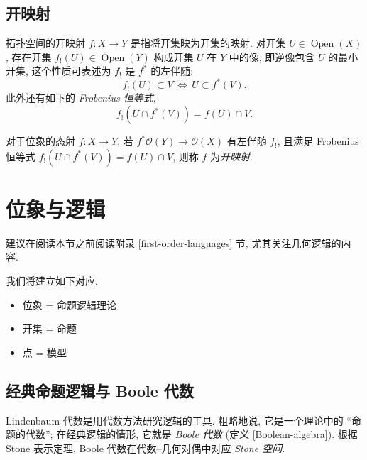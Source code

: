 \subsection{开映射}


拓扑空间的开映射 $f\colon X\to Y$ 是指将开集映为开集的映射. 对开集 $U\in\operatorname{Open}(X)$, 存在开集
$f_!(U) \in \operatorname{Open}(Y)$ 构成开集 $U$ 在 $Y$ 中的像, 即逆像包含 $U$ 的最小开集, 这个性质可表述为 $f_!$ 是 $f^*$ 的左伴随:
\[
f_!(U) \subset V \,\Leftrightarrow\, U\subset f^*(V).
\]
此外还有如下的 \emph{Frobenius 恒等式},
\[
f_!(U\cap f^*(V)) = f(U)\cap V.
\]

\begin{definition}
	{}
	对于位象的态射 $f\colon X\to Y$, 若 $f^*\mathcal O(Y)\to \mathcal O(X)$ 有左伴随 $f_!$, 且满足 Frobenius 恒等式 $f_!(U\cap f^*(V)) = f(U)\cap V$, 则称 $f$ 为\emph{开映射}.
\end{definition}



\section{位象与逻辑}

\label{locales-and-logic}


建议在阅读本节之前阅读附录 \ref{first-order-languages} 节, 尤其关注几何逻辑的内容.


我们将建立如下对应.

\begin{itemize}
	\item 位象 = 命题逻辑理论
	\item 开集 = 命题
	\item 点 = 模型
\end{itemize}

\subsection{经典命题逻辑与 Boole 代数}

Lindenbaum 代数是用代数方法研究逻辑的工具. 粗略地说, 它是一个理论中的 ``命题的代数''; 在经典逻辑的情形, 它就是 \emph{Boole 代数} (定义 \ref{Boolean-algebra}). 根据 Stone 表示定理, Boole 代数在代数--几何对偶中对应 \emph{Stone 空间}.

